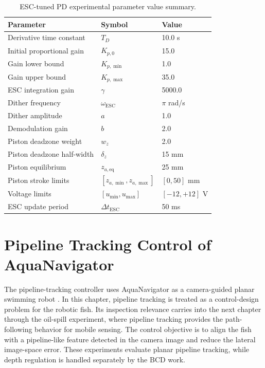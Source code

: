 \documentclass{uhcoethesis}
\begin{document}
\begin{table}[t]
    \centering
    \caption{ESC-tuned PD experimental parameter value summary.}
    \label{tab:ch3_esc_parameters}
    \begin{tabular}{lll}
        \hline
        Parameter & Symbol & Value \\
        \hline
        Derivative time constant & $T_D$ & 10.0 s \\
        Initial proportional gain & $K_{p,0}$ & 15.0 \\
        Gain lower bound & $K_{p,\min}$ & 1.0 \\
        Gain upper bound & $K_{p,\max}$ & 35.0 \\
        ESC integration gain & $\gamma$ & 5000.0 \\
        Dither frequency & $\omega_{\mathrm{ESC}}$ & $\pi$ rad/s \\
        Dither amplitude & $a$ & 1.0 \\
        Demodulation gain & $b$ & 2.0 \\
        Piston deadzone weight & $w_z$ & 2.0 \\
        Piston deadzone half-width & $\delta_z$ & 15 mm \\
        Piston equilibrium & $z_{a,\mathrm{eq}}$ & 25 mm \\
        Piston stroke limits & $[z_{a,\min},z_{a,\max}]$ & $[0,50]$ mm \\
        Voltage limits & $[u_{\min},u_{\max}]$ & $[-12,+12]$ V \\
        ESC update period & $\Delta t_{\mathrm{ESC}}$ & 50 ms \\
        \hline
    \end{tabular}
\end{table}

\section{Pipeline Tracking Control of AquaNavigator}

The pipeline-tracking controller uses AquaNavigator as a camera-guided planar swimming robot \cite{Masood2025Pipeline}. In this chapter, pipeline tracking is treated as a control-design problem for the robotic fish. Its inspection relevance carries into the next chapter through the oil-spill experiment, where pipeline tracking provides the path-following behavior for mobile sensing. The control objective is to align the fish with a pipeline-like feature detected in the camera image and reduce the lateral image-space error. These experiments evaluate planar pipeline tracking, while depth regulation is handled separately by the BCD work.
\end{document}
